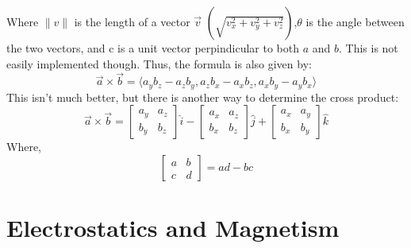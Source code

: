 \documentclass[a4paper,12pt]{article}
\begin{document}
				Where $\|v\|$ is the length of a vector $\vec{v}$  $\left( \sqrt{v_{x}^{2} + v_{y}^{2} + v_{z}^{2}}\right)$,$\theta$ is the angle between the two vectors, and c is a unit vector perpindicular to both $a$ and $b$. This is not easily implemented though. Thus, the formula is also given by:
				\begin{equation*}
						\vec{a} \times \vec{b} = \langle a_{y}b_{z} - a_{z}b_{y}, a_{z}b_{x} - a_{x}b_{z}, a_{x}b_{y}-a_{y}b_{x}\rangle
				\end{equation*}
				This isn't much better, but there is another way to determine the cross product:
				\begin{equation*}
						\vec{a} \times \vec{b} = \begin{bmatrix}
						a_{y} & a_{z} \\
						b_{y} & b_{z} 
						\end{bmatrix}\hat{i} - \begin{bmatrix}
						a_{x} & a_{z} \\
						b_{x}& b_{z} 
						\end{bmatrix}\hat{j} + \begin{bmatrix}
						a_{x} & a_{y} \\
						b_{x}& b_{y} 
						\end{bmatrix}\hat{k} 
				\end{equation*}
				Where,
				\begin{equation*}
						\begin{bmatrix}
								a & b \\
								c & d
						\end{bmatrix} = ad-bc
				\end{equation*}
	\newpage
	\part{Electrostatics and Magnetism}
\end{document}
